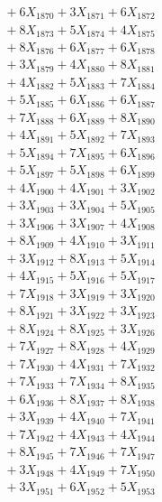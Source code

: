 \documentclass[a4paper,10pt]{article}
\begin{document}
{\begin{align}
&\;  + 6 X_{1870} + 3 X_{1871} + 6 X_{1872} \\[0.3ex]
&\;  + 8 X_{1873} + 5 X_{1874} + 4 X_{1875} \\[0.3ex]
&\;  + 8 X_{1876} + 6 X_{1877} + 6 X_{1878} \\[0.3ex]
&\;  + 3 X_{1879} + 4 X_{1880} + 8 X_{1881} \\[0.3ex]
&\;  + 4 X_{1882} + 5 X_{1883} + 7 X_{1884} \\[0.3ex]
&\;  + 5 X_{1885} + 6 X_{1886} + 6 X_{1887} \\[0.3ex]
&\;  + 7 X_{1888} + 6 X_{1889} + 8 X_{1890} \\[0.3ex]
&\;  + 4 X_{1891} + 5 X_{1892} + 7 X_{1893} \\[0.3ex]
&\;  + 5 X_{1894} + 7 X_{1895} + 6 X_{1896} \\[0.3ex]
&\;  + 5 X_{1897} + 5 X_{1898} + 6 X_{1899} \\[0.5ex]\allowbreak
&\;  + 4 X_{1900} + 4 X_{1901} + 3 X_{1902} \\[0.3ex]
&\;  + 3 X_{1903} + 3 X_{1904} + 5 X_{1905} \\[0.3ex]
&\;  + 3 X_{1906} + 3 X_{1907} + 4 X_{1908} \\[0.3ex]
&\;  + 8 X_{1909} + 4 X_{1910} + 3 X_{1911} \\[0.3ex]
&\;  + 3 X_{1912} + 8 X_{1913} + 5 X_{1914} \\[0.3ex]
&\;  + 4 X_{1915} + 5 X_{1916} + 5 X_{1917} \\[0.3ex]
&\;  + 7 X_{1918} + 3 X_{1919} + 3 X_{1920} \\[0.3ex]
&\;  + 8 X_{1921} + 3 X_{1922} + 3 X_{1923} \\[0.3ex]
&\;  + 8 X_{1924} + 8 X_{1925} + 3 X_{1926} \\[0.3ex]
&\;  + 7 X_{1927} + 8 X_{1928} + 4 X_{1929} \\[0.5ex]\allowbreak
&\;  + 7 X_{1930} + 4 X_{1931} + 7 X_{1932} \\[0.3ex]
&\;  + 7 X_{1933} + 7 X_{1934} + 8 X_{1935} \\[0.3ex]
&\;  + 6 X_{1936} + 8 X_{1937} + 8 X_{1938} \\[0.3ex]
&\;  + 3 X_{1939} + 4 X_{1940} + 7 X_{1941} \\[0.3ex]
&\;  + 7 X_{1942} + 4 X_{1943} + 4 X_{1944} \\[0.3ex]
&\;  + 8 X_{1945} + 7 X_{1946} + 7 X_{1947} \\[0.3ex]
&\;  + 3 X_{1948} + 4 X_{1949} + 7 X_{1950} \\[0.3ex]
&\;  + 3 X_{1951} + 6 X_{1952} + 5 X_{1953} \\[0.3ex]

\end{align}}
\end{document}
